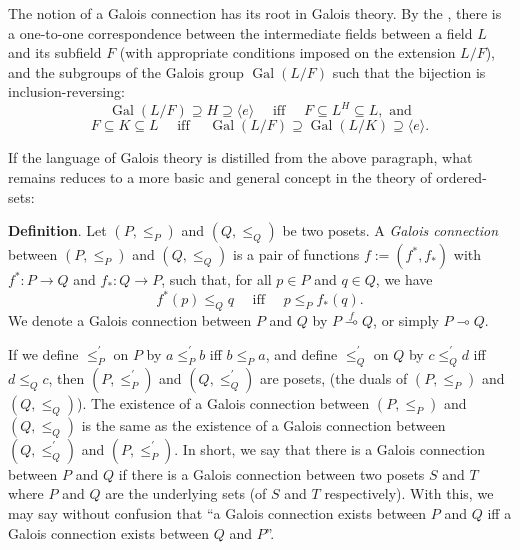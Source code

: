\documentclass[12pt]{article}
\begin{document}

The notion of a Galois connection has its root in Galois theory.  By the , there is a one-to-one correspondence between the intermediate fields between a field $L$ and its subfield $F$ (with appropriate conditions imposed on the extension $L/F$), and the subgroups of the Galois group $\operatorname{Gal}(L/F)$ such that the bijection is inclusion-reversing:
$$\operatorname{Gal}(L/F)\supseteq H\supseteq\langle e \rangle\quad  \mbox{ iff }\quad F\subseteq L^H\subseteq L,\mbox{ and}$$ 
$$F\subseteq K\subseteq L\quad\mbox{ iff }\quad \operatorname{Gal}(L/F)\supseteq \operatorname{Gal}(L/K)\supseteq\langle e \rangle.$$

If the language of Galois theory is distilled from the above paragraph, what remains reduces to a more basic and general concept in the theory of ordered-sets:

\textbf{Definition}.  Let $(P, \le_P)$ and $(Q, \le_Q)$ be two posets. A \emph{Galois connection} between $(P,\le_P)$ and $(Q,\le_Q)$ is a pair of functions $f:=(f^*,f_*)$ with $f^*\colon P\to Q$ and $f_*\colon Q\to P$, such that, for all $p\in P$ and $q\in Q$, we have $$f^*(p)\leq_Q q\quad \mbox{ iff }\quad p\leq_P f_*(q).$$ We denote a Galois
connection between $P$ and $Q$ by $P\stackrel{f}{\multimap}Q$, or simply $P\multimap Q$.

If we define $\le_P^{\prime}$ on $P$ by $a\le_P^{\prime}b$ iff $b\le_P a$, and define $\le_Q^{\prime}$ on $Q$ by $c\le_Q^{\prime}d$ iff $d\le_Q c$, then $(P,\le_P^{\prime})$ and $(Q,\le_Q^{\prime})$ are posets, (the duals of $(P,\le_P)$ and $(Q,\le_Q)$).  The existence of a Galois connection between $(P,\le_P)$ and $(Q,\le_Q)$ is the same as the existence of a Galois connection between $(Q,\le_Q^{\prime})$ and $(P,\le_P^{\prime})$.  In short, we say that there is a Galois connection between $P$ and $Q$ if there is a Galois connection between two posets $S$ and $T$ where $P$ and $Q$ are the underlying sets (of $S$ and $T$ respectively).  With this, we may say without confusion that ``a Galois connection exists between $P$ and $Q$ iff a Galois connection exists between $Q$ and $P$''.
\end{document}

